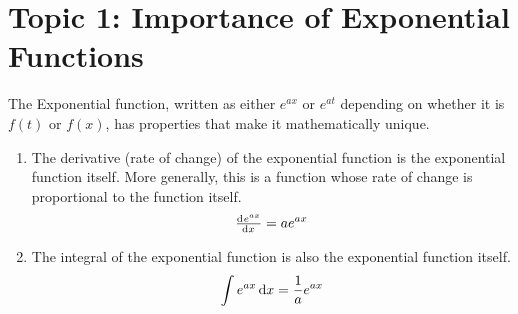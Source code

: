 \documentclass[../notes-main.tex]{subfiles}
\begin{document}
\section{Topic 1: Importance of Exponential Functions}
The Exponential function, written as either
\(e^{ax}\) or \(e^{at}\) depending on whether it is \(f(t)\) or \(f(x)\),
has properties that make it mathematically unique.

\begin{enumerate}
    \item The derivative (rate of change) of the exponential function is the exponential function itself. More generally, this is a function whose rate of change is proportional to the function itself.
          \begin{equation}
              \od{e^{ax}}{x} = ae^{ax}
          \end{equation}\label{eq:exp-deriv}
    \item The integral of the exponential function is also the exponential function itself.
          \begin{equation}
              \int e^{ax} \dif x = \frac{1}{a}e^{ax}
          \end{equation}\label{eq:exp-integral}
\end{enumerate}
\end{document}
